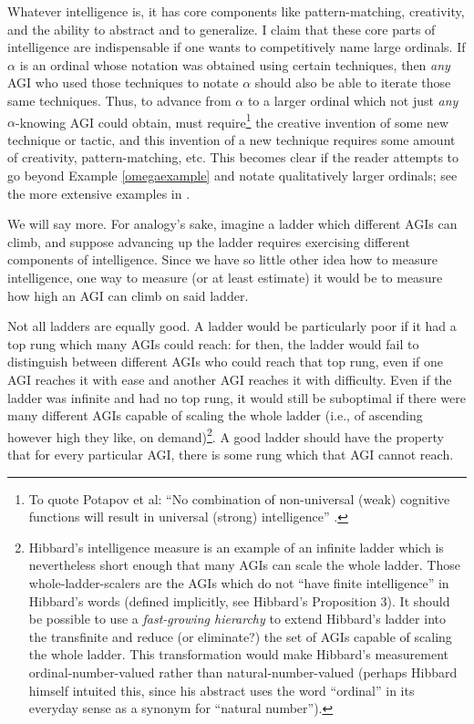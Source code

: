 \documentclass[runningheads]{llncs}
\begin{document}
Whatever intelligence is, it has core components like pattern-matching,
creativity, and the ability to abstract and to generalize.
I claim that these core parts of intelligence are indispensable if one wants to
competitively name large ordinals. If $\alpha$ is an ordinal whose
notation was obtained using certain techniques, then \emph{any} AGI who used those
techniques to notate $\alpha$ should also be able to iterate those same techniques.
Thus, to advance from
$\alpha$ to a larger ordinal which not just \emph{any} $\alpha$-knowing
AGI could obtain, must require\footnote{To quote Potapov et al: ``No combination of
non-universal (weak) cognitive functions will result in universal
(strong) intelligence'' \cite{potapov2012cognitive}.}
the creative invention of some new technique or tactic, and
this invention of a new technique requires some amount of creativity,
pattern-matching, etc. This becomes clear if the reader attempts to
go beyond Example \ref{omegaexample} and notate qualitatively larger ordinals;
see the more extensive examples in \cite{github}.

We will say more.
For analogy's sake, imagine a ladder which different AGIs
can climb, and suppose advancing up the ladder requires exercising different
components of intelligence. Since we have so little other idea how to measure
intelligence, one way to measure (or at least estimate) it would be
to measure how high an AGI can climb on said ladder.

Not all ladders are equally good. A ladder would be particularly poor if it had
a top rung which many AGIs could reach: for then, the ladder would fail to
distinguish between different AGIs who could reach that top rung, even if one
AGI reaches it with ease and another AGI reaches it with difficulty.
Even if the ladder was infinite and had no top rung, it would still be suboptimal
if there were many different AGIs capable of scaling the whole
ladder (i.e., of ascending however high they like, on demand)\footnote{Hibbard's
intelligence measure
\cite{hibbard2011measuring} is an example of an infinite ladder
which is nevertheless short enough that many AGIs can
scale the whole ladder. Those whole-ladder-scalers are the AGIs which
do not ``have finite intelligence'' in Hibbard's words
(defined implicitly, see Hibbard's Proposition 3). It should be possible to
use a \emph{fast-growing hierarchy}
\cite{fairtlough1998hierarchies} \cite{weiermann2002slow}
to extend Hibbard's ladder into the transfinite and reduce (or eliminate?)
the set of AGIs capable of scaling the whole ladder. This transformation would make
Hibbard's measurement ordinal-number-valued rather than natural-number-valued
(perhaps Hibbard himself intuited this, since his abstract uses the
word ``ordinal''
in its everyday sense as a synonym for ``natural number'').}.
A good ladder
should have the property that for every particular AGI, there is some rung which
that AGI cannot reach.
\end{document}
